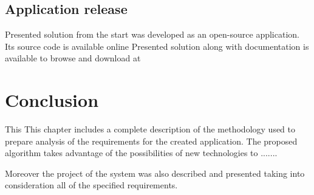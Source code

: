 \subsection{Application release}
Presented solution from the start was developed as an open-source application. Its source code is available online
Presented solution along with documentation is available to browse and download at 


\section{Conclusion}
This 
This chapter includes a complete description of the methodology used to prepare analysis of the requirements for the created application. The proposed algorithm takes advantage of the possibilities of new technologies to .......

Moreover the project of the system was also described and presented taking into consideration all of the specified requirements.